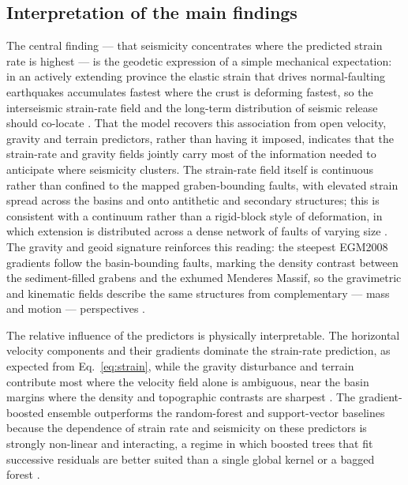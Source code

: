 \documentclass[pdflatex,sn-mathphys-num]{sn-jnl}%
\theoremstyle{thmstyleone}%
\theoremstyle{thmstyletwo}%
\theoremstyle{thmstylethree}%
\begin{document}
\subsection{Interpretation of the main findings}\label{sec:interp}
The central finding --- that seismicity concentrates where the predicted strain rate
is highest --- is the geodetic expression of a simple mechanical expectation: in an
actively extending province the elastic strain that drives normal-faulting earthquakes
accumulates fastest where the crust is deforming fastest, so the interseismic
strain-rate field and the long-term distribution of seismic release should co-locate
\cite{ManaughKreemer2018,Bahrami2021,Hussain2018}. That the model recovers this
association from open velocity, gravity and terrain predictors, rather than having it
imposed, indicates that the strain-rate and gravity fields jointly carry most of the
information needed to anticipate where seismicity clusters. The strain-rate field
itself is continuous rather than confined to the mapped graben-bounding faults, with
elevated strain spread across the basins and onto antithetic and secondary structures;
this is consistent with a continuum rather than a rigid-block style of deformation, in
which extension is distributed across a dense network of faults of varying size
\cite{Diercks2024,Aktug2009,Wernicke1985,JacksonWhite1989,Weiss2020}. The gravity and geoid signature reinforces this
reading: the steepest EGM2008 gradients follow the basin-bounding faults, marking the
density contrast between the sediment-filled grabens and the exhumed Menderes Massif,
so the gravimetric and kinematic fields describe the same structures from
complementary --- mass and motion --- perspectives \cite{Pavlis2012,BozkurtSozbilir2004,Lemenkova202228,Ince2019,Hirt2013,Kent2016,Diercks2024}.

The relative influence of the predictors is physically interpretable. The horizontal
velocity components and their gradients dominate the strain-rate prediction, as
expected from Eq.~\eqref{eq:strain}, while the gravity disturbance and terrain
contribute most where the velocity field alone is ambiguous, near the basin margins
where the density and topographic contrasts are sharpest \cite{Sandwell2014,Pavlis2012,Lemenkova202316,BozkurtSozbilir2004,Kent2016,Diercks2024}.
The gradient-boosted ensemble outperforms the random-forest and support-vector
baselines because the dependence of strain rate and seismicity on these predictors is
strongly non-linear and interacting, a regime in which boosted trees that fit
successive residuals are better suited than a single global kernel or a bagged
forest \cite{Friedman2001,ChenGuestrin2016,Lemenkova202518,Breiman2001,Bergen2019}.
\end{document}
